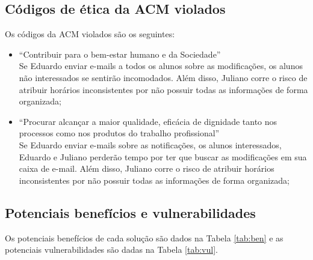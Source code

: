 \documentclass[a4paper,dvipdfm]{article}
\begin{document}
	\subsection{Códigos de ética da ACM violados}
		Os códigos da ACM violados são os seguintes:
		\begin{itemize}
			\item ``Contribuir para o bem-estar humano e da Sociedade''\\
				Se Eduardo enviar e-mails a todos os alunos sobre as modificações, os alunos não interessados se sentirão incomodados.
				Além disso, Juliano corre o risco de atribuir horários inconsistentes por não possuir todas as informações de forma organizada;
			\item ``Procurar alcançar a maior qualidade, eficácia de dignidade tanto nos processos como nos produtos do trabalho profissional''\\
				Se Eduardo enviar e-mails sobre as notificações, os alunos interessados, Eduardo e Juliano perderão tempo por ter que buscar as modificações em sua caixa de e-mail.
				Além disso, Juliano corre o risco de atribuir horários inconsistentes por não possuir todas as informações de forma organizada;
				
		\end{itemize}

	\subsection{Potenciais benefícios e vulnerabilidades}
		Os potenciais benefícios de cada solução são dados na Tabela \ref{tab:ben} e as potenciais vulnerabilidades são dadas na Tabela \ref{tab:vul}.
\end{document}
